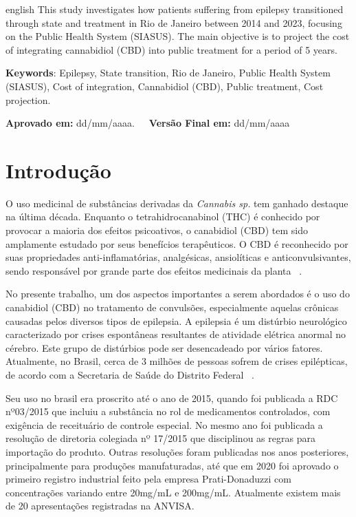 \documentclass[article,a4paper,12pt,brazil,sumario=tradicional]{abntex2}
\begin{document}
\vspace{-.3cm}
\begin{hyphenrules}{english}
\noindent This study investigates how patients suffering from epilepsy transitioned through state and treatment in Rio de Janeiro between 2014 and 2023, focusing on the Public Health System (SIASUS). The main objective is to project the cost of integrating cannabidiol (CBD) into public treatment for a period of 5 years.
\end{hyphenrules}
\vspace{.4cm}
 
\noindent \textbf{Keywords}: Epilepsy, State transition, Rio de Janeiro, Public Health System (SIASUS), Cost of integration, Cannabidiol (CBD), Public treatment, Cost projection.

\vspace{.4cm}

\noindent \textbf{Aprovado em:} dd/mm/aaaa.~~~\textbf{Versão Final em:} dd/mm/aaaa

\section{Introdução}

O uso medicinal de substâncias derivadas da \textit{Cannabis sp.} tem ganhado destaque na última década. Enquanto o tetrahidrocanabinol (THC) é conhecido por provocar a maioria dos efeitos psicoativos, o canabidiol (CBD) tem sido amplamente estudado por seus benefícios terapêuticos. O CBD é reconhecido por suas propriedades anti-inflamatórias, analgésicas, ansiolíticas e anticonvulsivantes, sendo responsável por grande parte dos efeitos medicinais da planta ~\cite{blessing2015cannabidiol}.

No presente trabalho, um dos aspectos importantes a serem abordados é o uso do canabidiol (CBD) no tratamento de convulsões, especialmente aquelas crônicas causadas pelos diversos tipos de epilepsia. A epilepsia é um distúrbio neurológico caracterizado por crises espontâneas resultantes de atividade elétrica anormal no cérebro. Este grupo de distúrbios pode ser desencadeado por vários fatores. Atualmente, no Brasil, cerca de 3 milhões de pessoas sofrem de crises epilépticas, de acordo com a Secretaria de Saúde do Distrito Federal ~\cite{epilepsia2022}.

Seu uso no brasil era proscrito até o ano de 2015, quando foi publicada a RDC nº03/2015 que incluiu a substância no rol de medicamentos controlados, com exigência de receituário de controle especial. No mesmo ano foi publicada a resolução de diretoria colegiada nº 17/2015 que disciplinou as regras para importação do produto. Outras resoluções foram publicadas nos anos posteriores, principalmente para produções manufaturadas, até que em 2020 foi aprovado o primeiro registro industrial feito pela empresa Prati-Donaduzzi com concentrações variando entre 20mg/mL e 200mg/mL. Atualmente existem mais de 20 apresentações registradas na ANVISA.
\end{document}
